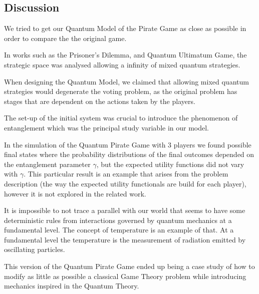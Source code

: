 \clearpage
\subsection{Discussion}
\label{subsec:3playergame:discution}

We tried to get our Quantum Model of the Pirate Game as close as possible in order to compare the the original game. 

In works such as the Prisoner's Dilemma\cite{Letters2002}\cite{Eisert2008}, and Quantum Ultimatum Game\cite{Fra2011}, the strategic space was analysed allowing a infinity of mixed quantum strategies.

When designing the Quantum Model, we claimed that allowing mixed quantum strategies would degenerate the voting problem, as the original problem has stages that are dependent on the actions taken by the players.

The set-up of the initial system was crucial to introduce the phenomenon of entanglement which was the principal study variable in our model.

In the simulation of the Quantum Pirate Game with $3$ players we found possible final states where the probability distributions of the final outcomes depended on the entanglement parameter $\gamma$, but the expected utility functions did not vary with $\gamma$. This particular result is an example that arises from the problem description (the way the expected utility functionals are build for each player), however it is not explored in the related work. 

It is impossible to not trace a parallel with our world that seems to have some deterministic rules from interactions governed by quantum mechanics at a fundamental level. The concept of temperature is an example of that. At a fundamental level the temperature is the measurement of radiation emitted by oscillating particles. 


This version of the Quantum Pirate Game ended up being a case study of how to modify as little as possible a classical Game Theory problem while introducing mechanics inspired in the Quantum Theory. 

 






